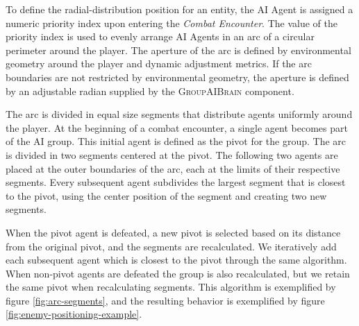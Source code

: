 
To define the radial-distribution position for an entity, the AI Agent is assigned a numeric priority index upon entering the \emph{Combat Encounter}. The value of the priority index is used to evenly arrange AI Agents in an arc of a circular perimeter around the player. The aperture of the arc is defined by environmental geometry around the player and dynamic adjustment metrics. If the arc boundaries are not restricted by environmental geometry, the aperture is defined by an adjustable radian supplied by the \textsc{GroupAIBrain} component.

The arc is divided in equal size segments that distribute agents uniformly around the player. At the beginning of a combat encounter, a single agent becomes part of the AI group. This initial agent is defined as the pivot for the group. The arc is divided in two segments centered at the pivot. The following two agents are placed at the outer boundaries of the arc, each at the limits of their respective segments. Every subsequent agent subdivides the largest segment that is closest to the pivot, using the center position of the segment and creating two new segments.

When the pivot agent is defeated, a new pivot is selected based on its distance from the original pivot, and the segments are recalculated. We iteratively add each subsequent agent which is closest to the pivot through the same algorithm. When non-pivot agents are defeated the group is also recalculated, but we retain the same pivot when recalculating segments. This algorithm is exemplified by figure \ref{fig:arc-segments}, and the resulting behavior is exemplified by figure \ref{fig:enemy-positioning-example}.




